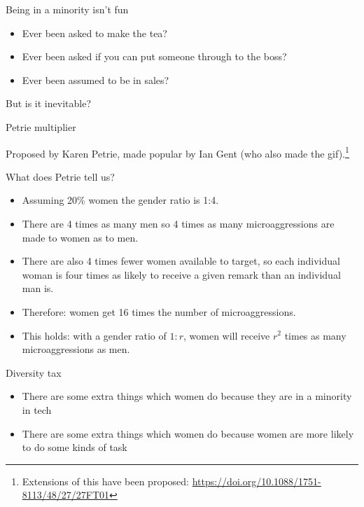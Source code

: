 \documentclass[xcolor=table,aspectratio=169]{beamer}
\begin{document}
\begin{frame}{Being in a minority isn't fun }
	\begin{itemize}
		\item Ever been asked to make the tea?
			\pause
		\item Ever been asked if you can put someone through to the boss?
			\pause
		\item Ever been assumed to be in sales?
	\end{itemize}
	\vspace{0.5em}
But is it inevitable?
\end{frame}

\begin{frame}{Petrie multiplier}
	\transduration<0-71>{0}
				
			Proposed by Karen Petrie, made popular by Ian Gent (who also made the gif).\footnote{Extensions of this have been proposed: \url{https://doi.org/10.1088/1751-8113/48/27/27FT01}}
\end{frame}

\begin{frame}{What does Petrie tell us?}

	\begin{itemize}
		\item Assuming 20\% women the gender ratio is 1:4. 
	        \item There are 4 times as many men so 4 times as many microaggressions are made to women as to men. 
		\item There are also 4 times fewer women available to target, so each individual woman is four times as likely to receive a given remark than an individual man is. 
		\item Therefore: women get 16 times the number of microaggressions. 
		\item This holds: with a gender ratio of $1:r$, women will receive $r^{2}$ times as many microaggressions as men.
	\end{itemize}
\end{frame}


\begin{frame}{Diversity tax}

\begin{itemize}
	\item There are some extra things which women do because they are in a minority in tech
	\item There are some extra things which women do because women are more likely to do some kinds of task
\end{itemize}

\end{frame}
\end{document}
